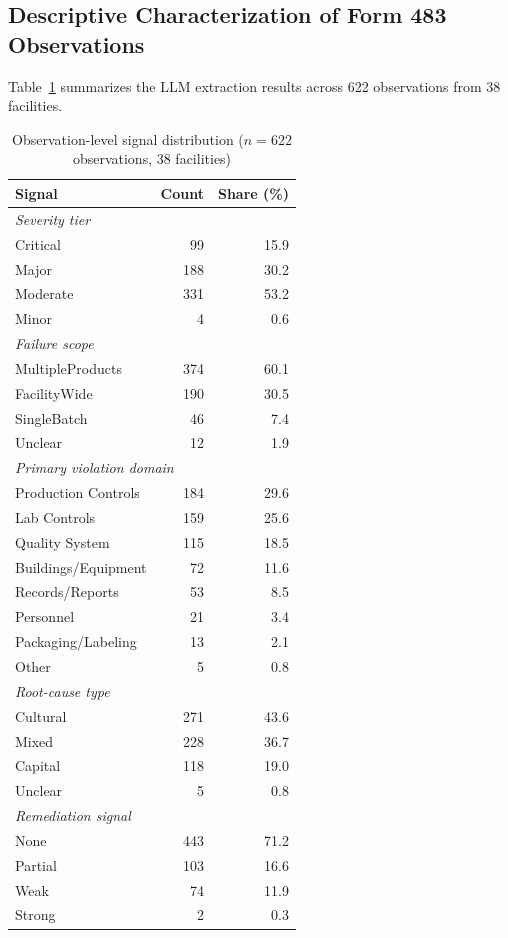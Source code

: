 \documentclass[12pt]{article}
\begin{document}
\subsection{Descriptive Characterization of Form 483 Observations}

Table~\ref{tab:obs_desc} summarizes the LLM extraction results across
622 observations from 38 facilities.

\begin{table}[h!]
\centering
\caption{Observation-level signal distribution ($n = 622$ observations,
         38 facilities)}
\label{tab:obs_desc}
\begin{tabular}{lrr}
\toprule
\textbf{Signal} & \textbf{Count} & \textbf{Share (\%)} \\
\midrule
\multicolumn{3}{l}{\textit{Severity tier}} \\
\quad Critical  &  99 & 15.9 \\
\quad Major     & 188 & 30.2 \\
\quad Moderate  & 331 & 53.2 \\
\quad Minor     &   4 &  0.6 \\
\midrule
\multicolumn{3}{l}{\textit{Failure scope}} \\
\quad MultipleProducts & 374 & 60.1 \\
\quad FacilityWide     & 190 & 30.5 \\
\quad SingleBatch      &  46 &  7.4 \\
\quad Unclear          &  12 &  1.9 \\
\midrule
\multicolumn{3}{l}{\textit{Primary violation domain}} \\
\quad Production Controls  & 184 & 29.6 \\
\quad Lab Controls         & 159 & 25.6 \\
\quad Quality System       & 115 & 18.5 \\
\quad Buildings/Equipment  &  72 & 11.6 \\
\quad Records/Reports      &  53 &  8.5 \\
\quad Personnel            &  21 &  3.4 \\
\quad Packaging/Labeling   &  13 &  2.1 \\
\quad Other                &   5 &  0.8 \\
\midrule
\multicolumn{3}{l}{\textit{Root-cause type}} \\
\quad Cultural  & 271 & 43.6 \\
\quad Mixed     & 228 & 36.7 \\
\quad Capital   & 118 & 19.0 \\
\quad Unclear   &   5 &  0.8 \\
\midrule
\multicolumn{3}{l}{\textit{Remediation signal}} \\
\quad None    & 443 & 71.2 \\
\quad Partial & 103 & 16.6 \\
\quad Weak    &  74 & 11.9 \\
\quad Strong  &   2 &  0.3 \\
\bottomrule
\end{tabular}
\end{table}
\end{document}
